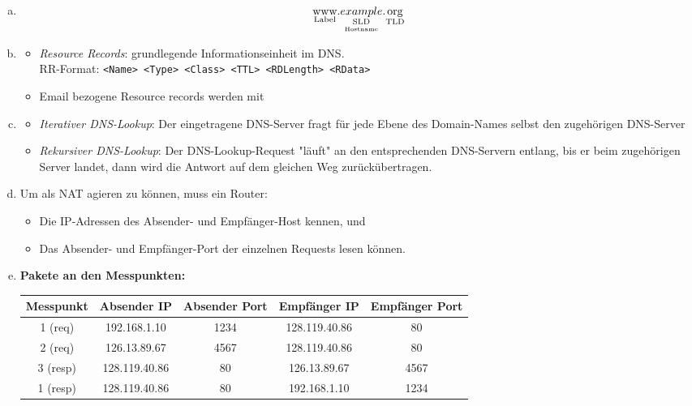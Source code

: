 \pagebreak

\begin{enumerate}[a)]
	
	\item $$\underset{\text{Label}}{\text{www}}.\underset{\underset{\text{Hostname}}{\text{SLD}}}{example}.\underset{\text{TLD}}{\text{org}}$$
	
	\item \begin{itemize}
		\item \emph{Resource Records}: grundlegende Informationseinheit im DNS. \\
		   RR-Format: \texttt{<Name> <Type> <Class> <TTL> <RDLength> <RData>}
		\item Email bezogene Resource records werden mit 
	\end{itemize}
	
	\item \begin{itemize}
		\item \emph{Iterativer DNS-Lookup}: Der eingetragene DNS-Server fragt für jede Ebene des Domain-Names selbst den 
		zugehörigen DNS-Server
		\item \emph{Rekursiver DNS-Lookup}: Der DNS-Lookup-Request "läuft" an den entsprechenden DNS-Servern entlang,
		bis er beim zugehörigen Server landet, dann wird die Antwort auf dem gleichen Weg zurückübertragen.
	\end{itemize}
	
	\item Um als NAT agieren zu können, muss ein Router: 
	\begin{itemize}
		\item Die IP-Adressen des Absender- und Empfänger-Host kennen, und
		\item Das Absender- und Empfänger-Port der einzelnen Requests lesen können.
	\end{itemize}
	
	\item \textbf{Pakete an den Messpunkten:} \\
		\begin{tabular}{c|c|c|c|c}
			Messpunkt & Absender IP   & Absender Port & Empfänger IP  & Empfänger Port \\ \hline
			1 (req)   & 192.168.1.10  & 1234          & 128.119.40.86 & 80             \\ 
			2 (req)   & 126.13.89.67  & 4567          & 128.119.40.86 & 80             \\ 
			3 (resp)  & 128.119.40.86 & 80            & 126.13.89.67  & 4567           \\ 
			1 (resp)  & 128.119.40.86 & 80            & 192.168.1.10  & 1234
		\end{tabular}


\end{enumerate}

